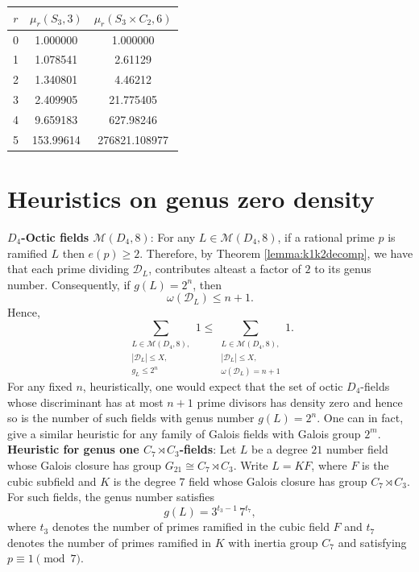 \documentclass[11pt,reqno]{amsart}
\newcommand{\cD}{\mathcal{D}}
\newcommand{\cM}{\mathcal{M}}
\theoremstyle{definition}
\theoremstyle{remark}
\begin{document}
\begin{center}
\begin{tabular}{|c|c|c|}
\hline
$r$ & $\mu_r(S_3,3)$ & $\mu_r(S_3\times C_2,6)$\\ 
\hline
0 & 1.000000 & 1.000000 \\
1 & 1.078541 &  2.61129\\
2 & 1.340801 & 4.46212\\
3 & 2.409905 &21.775405\\
4 & 9.659183 &627.98246 \\
5 & 153.99614& 276821.108977 \\
\hline
\end{tabular}
\end{center}
\medskip


    

\section{\bf Heuristics on genus zero density}\label{heuristics}
\noindent
{\bf $D_4$-Octic fields $\cM(D_4, 8)$}: For any $L\in \cM(D_4, 8)$, if a rational prime $p$ is ramified $L$ then $e(p)\geq2$. Therefore,  by Theorem \ref{lemma:k1k2decomp}, we have that each prime dividing $\cD_L$, contributes alteast a factor of $2$ to its genus number. Consequently, if $g(L)=2^n$, then
\[
\omega(\mathcal{D}_L)\le n+1.
\]
Hence,
\begin{equation*}
    \sum_{\substack{L\in \cM(D_4,8),\\ |\cD_L|\leq X,\\ g_L\leq 2^n}} 1 \leq   \sum_{\substack{L\in \cM(D_4,8),\\ |\cD_L|\leq X,\\ \omega(\cD_L)=n+1}} 1.
\end{equation*}
For any fixed $n$, heuristically, one would expect that the set of octic $D_4$-fields whose discriminant has at most $n+1$ prime divisors has density zero and hence so is the number of such fields with genus number $g(L)=2^n$. One can in fact, give a similar heuristic for any family of Galois fields with Galois group $2^m$.\\

\noindent
\textbf{Heuristic for genus one $C_7\rtimes C_3$-fields}: Let $L$ be a degree $21$ number field whose Galois closure has group  $G_{21}\cong C_7 \rtimes C_3$.
Write $L=KF$, where $F$ is the cubic subfield and $K$ is the degree $7$ field whose Galois closure has group $C_7\rtimes C_3$. For such fields, the genus number satisfies
\[
g(L)=3^{t_3-1}\,7^{t_7},
\]
where $t_3$ denotes the number of primes ramified in the cubic field $F$ and $t_7$ denotes the number of primes ramified in $K$ with inertia group $C_7$ and satisfying $p\equiv 1 \pmod{7}$.\\
\noindent
\end{document}
